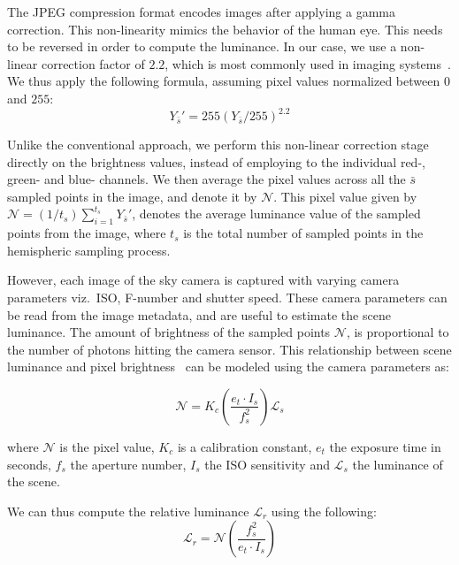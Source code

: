 The JPEG compression format encodes images after applying a gamma correction. This non-linearity mimics the behavior of the human eye. This needs to be reversed in order to compute the luminance. In our case, we use a non-linear correction factor of $2.2$, which is most commonly used in imaging systems~\cite{Poynton03}. We thus apply the following formula, assuming pixel values normalized between $0$ and $255$:
\[Y_{\bar{s}}' = 255{(Y_{\bar{s}}/255)}^{2.2}\]

Unlike the conventional approach, we perform this non-linear correction stage directly on the brightness values, instead of employing to the individual red-, green- and blue- channels. We then average the pixel values across all the $\bar{s}$ sampled points in the image, and denote it by $\mathcal{N}$. This pixel value given by $\mathcal{N} = (1/{t_s})\sum_{i=1}^{t_s} Y_{\bar{s}}'$, denotes the average luminance value of the sampled points from the image, where $t_s$ is the total number of sampled points in the hemispheric sampling process. 

However, each image of the sky camera is captured with varying camera parameters viz.\ ISO, F-number and shutter speed. These camera parameters can be read from the image metadata, and are useful to estimate the scene luminance. The amount of brightness of the sampled points $\mathcal{N}$, is proportional to the number of photons hitting the camera sensor. This relationship between scene luminance and pixel brightness~\cite{hiscocks2011measuring} can be modeled using the camera parameters as:

\[\mathcal{N} = K_c \left( \frac{e_t\cdot {I_s}}{f_s^2}\right) \mathcal{L}_s\]

where $\mathcal{N}$ is the pixel value, $K_c$ is a calibration constant, $e_t$ the exposure time in seconds, $f_s$ the aperture number, $I_s$ the ISO sensitivity and $\mathcal{L}_s$ the luminance of the scene.

We can thus compute the relative luminance $\mathcal{L}_r$ using the following:
\[\mathcal{L}_r = \mathcal{N} \left( \frac{f_s^2}{e_t\cdot {I_s}}\right)\]

